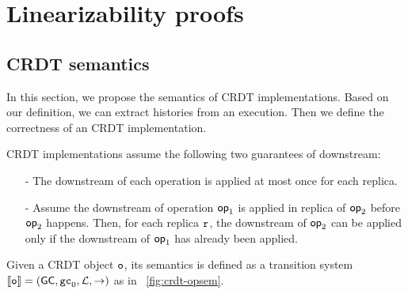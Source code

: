 \section{Linearizability proofs}


\subsection{CRDT semantics}

In this section, we propose the semantics of CRDT implementations. Based on our definition, we can extract histories from an execution. Then we define the correctness of an CRDT implementation.




CRDT implementations assume the following two guarantees of downstream:

\begin{itemize}
\setlength{\itemsep}{0.5pt}
\item[-] The downstream of each operation is applied at most once for each replica.
\item[-] Assume the downstream of operation $\mathsf{op}_1$ is applied in replica of $\mathsf{op}_2$ before $\mathsf{op}_2$ happens. Then, for each replica $\mathtt{r}$, the downstream of $\mathsf{op}_2$ can be applied only if the downstream of $\mathsf{op}_1$ has already been applied.
\end{itemize}

Given a CRDT object $\mathtt{o}$, its semantics is defined as a transition system $\llbracket \mathtt{o} \rrbracket = (\mathsf{GC},\mathtt{gc}_0,\mathcal{L},\rightarrow)$ as in \figurename~\ref{fig:crdt-opsem}.



